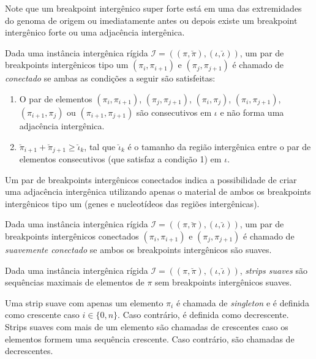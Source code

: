 Note que um breakpoint intergênico super forte está em uma das extremidades do genoma de origem ou imediatamente antes ou depois existe um breakpoint intergênico forte ou uma adjacência intergênica.

\begin{definition}
  Dada uma instância intergênica rígida $\mathcal{I} = ((\pi,\breve\pi),(\iota,\breve\iota))$, um par de breakpoints intergênicos tipo um $(\pi_{i},\pi_{i+1})$ e $(\pi_{j},\pi_{j+1})$ é chamado de \emph{conectado} se ambas as condições a seguir são satisfeitas:
  \begin{enumerate}
    \item O par de elementos $(\pi_{i},\pi_{i+1})$, $(\pi_{j},\pi_{j+1})$, $(\pi_{i},\pi_{j})$, $(\pi_{i},\pi_{j+1})$, $(\pi_{i+1},\pi_{j})$ ou $(\pi_{i+1},\pi_{j+1})$ são consecutivos em $\iota$ e não forma uma adjacência intergênica.
    \item $\breve\pi_{i+1} + \breve\pi_{j+1} \ge \breve\iota_{k}$, tal que $\breve\iota_{k}$ é o tamanho da região intergênica entre o par de elementos consecutivos (que satisfaz a condição 1) em $\iota$.
  \end{enumerate}
\end{definition}

Um par de breakpoints intergênicos conectados indica a possibilidade de criar uma adjacência intergênica utilizando apenas o material de ambos os breakpoints intergênicos tipo um (genes e nucleotídeos das regiões intergênicas).

\begin{definition}
Dada uma instância intergênica rígida $\mathcal{I} = ((\pi,\breve\pi),(\iota,\breve\iota))$, um par de breakpoints intergênicos conectados $(\pi_{i},\pi_{i+1})$ e $(\pi_{j},\pi_{j+1})$ é chamado de \emph{suavemente conectado} se ambos os breakpoints intergênicos são suaves.
\end{definition}

\begin{definition}
  Dada uma instância intergênica rígida $\mathcal{I} = ((\pi,\breve\pi),(\iota,\breve\iota))$, \emph{strips suaves} são sequências maximais de elementos de $\pi$ sem breakpoints intergênicos suaves.
\end{definition}

Uma strip suave com apenas um elemento $\pi_i$ é chamada de \emph{singleton} e é definida como crescente caso  $i \in \{0,n\}$. Caso contrário, é definida como decrescente. Strips suaves com mais de um elemento são chamadas de crescentes caso os elementos formem uma sequência crescente. Caso contrário, são chamadas de decrescentes.


